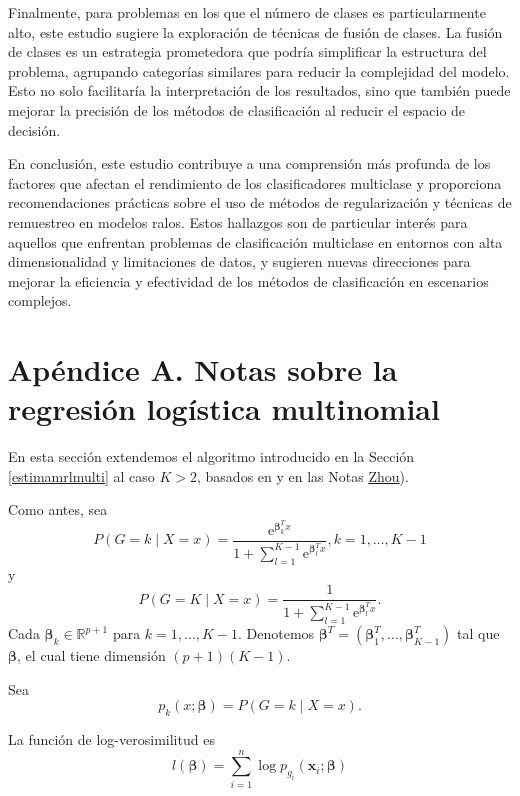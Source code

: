 \documentclass{report}
\begin{document}
 Finalmente, para problemas en los que el número de clases es particularmente alto, este estudio sugiere la exploración de técnicas de fusión de clases. La fusión de clases es un estrategia prometedora que podría simplificar la estructura del problema, agrupando categorías similares para reducir la complejidad del modelo. Esto no solo facilitaría la interpretación de los resultados, sino que también puede mejorar la precisión de los métodos de clasificación al reducir el espacio de decisión.

 En conclusión, este estudio contribuye a una comprensión más profunda de los factores que afectan el rendimiento de los clasificadores multiclase y proporciona recomendaciones prácticas sobre el uso de métodos de regularización y técnicas de remuestreo en modelos ralos. Estos hallazgos son de particular interés para aquellos que enfrentan problemas de clasificación multiclase en entornos con alta dimensionalidad y limitaciones de datos, y sugieren nuevas direcciones para mejorar la eficiencia y efectividad de los métodos de clasificación en escenarios complejos.
  
  
   \section*{Apéndice A. Notas sobre la regresión logística multinomial}\label{apenreglog}
  
  
  
  
  En esta sección  extendemos el algoritmo introducido en la Sección \ref{estimamrlmulti} al caso $K>2$, basados en \cite{htf} y en las Notas  \href{https://yuhangzhou88.github.io/ESL_Solution/ESL-Solution/4-Linear-Methods-for-Classification/ex4-4/}{Zhou}). 
  
  
  Como antes, sea 
  $$
  P(G=k \mid X=x)=\frac{\text{e}^{\boldsymbol{\beta}_k^T x }}{1+\sum_{l=1}^{K-1} \text{e}^{\boldsymbol{\beta}_l^T x }  }, k=1, \ldots, K-1
  $$
  y
  $$
  P(G=K \mid X=x)=\frac{1}{1+\sum_{l=1}^{K-1} \text{e}^{\boldsymbol{\beta}_l^T x }}.
  $$
  Cada  $ \boldsymbol{\beta}_k \in \mathbb{R}^{p+1}$ para $k=1, \ldots, K-1$. Denotemos $ \boldsymbol{\beta}^T=\left ( \boldsymbol{\beta}_1^T, \ldots,  \boldsymbol{\beta}_{K-1}^T\right)$ tal que  $ \boldsymbol{\beta}$, el cual tiene dimensión $(p+1)(K-1)$. 
  
  Sea 
  $$
  p_k(x ;  \boldsymbol{\beta})=P(G=k \mid X=x) .
  $$
  
  La función de log-verosimilitud es 
  $$
  l( \boldsymbol{\beta})=\sum_{i=1}^n \log p_{g_i}\left(\mathbf{x}_i ;  \boldsymbol{\beta}\right)
  $$
  
\end{document}

